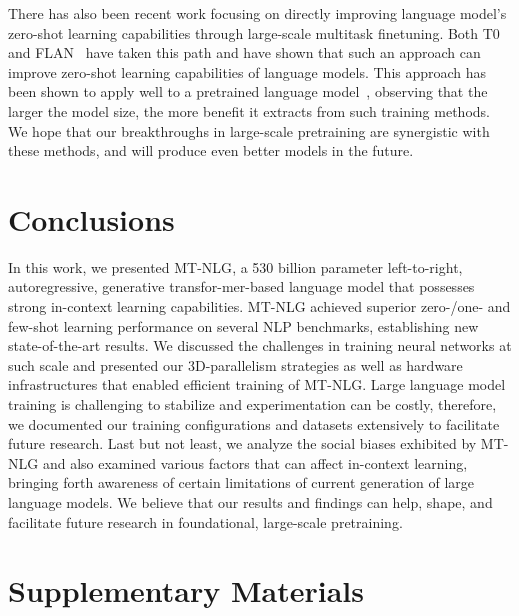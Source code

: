 \documentclass[11pt]{article}
\newcommand{\Zhun}[1]{{\color{magenta}{\textbf{Zhun}: #1}}}
\newcommand{\ours}{MT-NLG}
\begin{document}
There has also been recent work focusing on directly improving language model's zero-shot learning capabilities through large-scale multitask finetuning. Both T0~\citep{Sanh2021MultitaskPT} and FLAN~\citep{Wei2021FinetunedLM} have taken this path and have shown that such an approach can improve zero-shot learning capabilities of language models. This approach has been shown to apply well to a pretrained language model~\citep{Wei2021FinetunedLM}, observing that the larger the model size, the more benefit it extracts from such training methods. We hope that our breakthroughs in large-scale pretraining are synergistic with these methods, and will produce even better models in the future.



\section{Conclusions}
In this work, we presented {\ours}, a 530 billion parameter left-to-right, autoregressive, generative transfor-mer-based language model that possesses strong in-context learning capabilities. {\ours} achieved superior zero-/one- and few-shot learning performance on several NLP benchmarks, establishing new state-of-the-art results. We discussed the challenges in training neural networks at such scale and presented our 3D-parallelism strategies as well as hardware infrastructures that enabled efficient training of {\ours}. Large language model training is challenging to stabilize and experimentation can be costly, therefore, we documented our training configurations and datasets extensively to facilitate future research. Last but not least, we analyze the social biases exhibited by {\ours} and also examined various factors that can affect in-context learning, bringing forth awareness of certain limitations of current generation of large language models. We believe that our results and findings can help, shape, and facilitate future research in foundational, large-scale pretraining.




\FloatBarrier

\appendix

\section*{Supplementary Materials}
\end{document}
